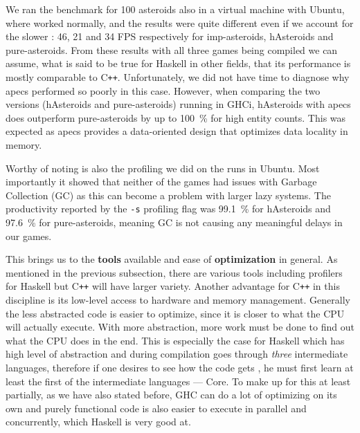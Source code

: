 \documentclass[
  digital, %
  color,   %
  table,   %
  oneside, %
  lof,     %
  lot,     %
]{fithesis3}
\newcommand{\cpp}{C\nolinebreak\texttt{+}\nolinebreak\texttt{+}}
\begin{document}
{We ran the benchmark for 100 asteroids also in a virtual machine with Ubuntu,
where  worked normally, and the results were quite different
even if we account for the slower :
46, 21 and 34 FPS respectively for imp-asteroids, hAsteroids and pure-asteroids.
From these results with all three games being compiled we can assume,
what is said to be true for Haskell in other fields,
that its performance is mostly comparable to \cpp{}.
Unfortunately, we did not have time to diagnose why apecs performed so poorly in this case.
However, when comparing the two versions (hAsteroids and pure-asteroids) running in GHCi,
hAsteroids with apecs does outperform pure-asteroids by up to 100~\% for high entity counts.
This was expected as apecs provides a data-oriented design that optimizes data locality in memory.

Worthy of noting is also the profiling we did on the runs in Ubuntu.
Most importantly it showed that neither of the games had issues with Garbage Collection (GC)
as this can become a problem with larger lazy systems.
The productivity reported by the \texttt{-s} profiling flag was 99.1~\%
for hAsteroids and 97.6~\% for pure-asteroids,
meaning GC is not causing any meaningful delays in our games.

This brings us to the \textbf{tools} available and ease of \textbf{optimization} in general.
As mentioned in the previous subsection, there are various tools including
profilers for Haskell but \cpp{} will have larger variety. Another advantage
for \cpp{} in this discipline is its low-level access to hardware and memory management.
Generally the less abstracted code is easier to optimize, since it is closer to
what the CPU will actually execute. With more abstraction, more work must be
done to find out what the CPU does in the end. This is especially the case for Haskell
which has high level of abstraction and during compilation goes through \emph{three} intermediate
languages, therefore if one desires to see how the code gets , he must
first learn at least the first of the intermediate languages --- Core.
To make up for this at least partially, as we have also stated before,
GHC can do a lot of optimizing on its own and purely functional code is also easier
to execute in parallel and concurrently, which Haskell is very good at.



}
\end{document}
